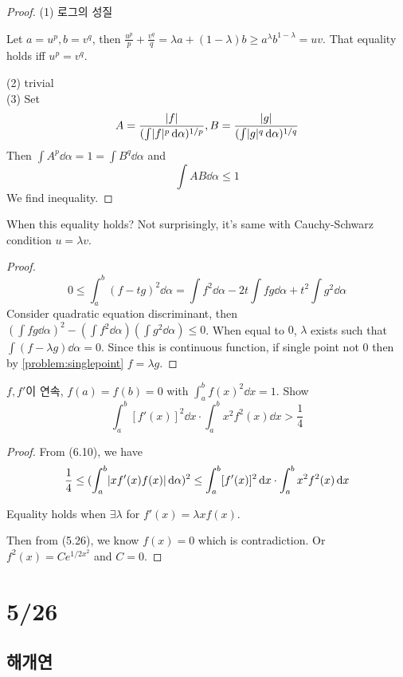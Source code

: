 \documentclass{article}
\begin{document}
\begin{proof}
    (1) 로그의 성질

    Let $a=u^p, b=v^q$, then $\frac{u^p}{p}+\frac{v^q}{q}= \lambda a + (1-\lambda) b \geq a^{\lambda}b^{1-\lambda}=uv$. That equality holds iff $u^p = v^q$.

    (2) trivial\\
    (3) Set \[A=\frac{\lvert f\rvert}{(\int \lvert f\rvert^p \,\mathrm{d}\alpha)^{1/p}},\\B=\frac{\lvert g\rvert}{(\int \lvert g\rvert^q \,\mathrm{d}\alpha)^{1/q}}\] Then $\int A^p \dd\alpha=1=\int B^q \dd\alpha$ and \[\int AB \dd\alpha \leq 1\] We find inequality.
\end{proof}

When this equality holds? Not surprisingly, it's same with Cauchy-Schwarz condition $u=\lambda v$.

\begin{proof}
    \[0 \leq \int^b_a (f-tg)^2 \dd\alpha = \int f^2 \dd\alpha - 2t \int fg \dd\alpha + t^2 \int g^2 \dd\alpha\]
    Consider quadratic equation discriminant, then $(\int fg \dd\alpha)^2 - (\int f^2 \dd\alpha)(\int g^2\dd\alpha) \leq 0$. When equal to $0$, $\lambda$ exists such that $\int (f-\lambda g) \dd\alpha=0$. Since this is continuous function, if single point not $0$ then by \cref{problem:singlepoint} $f=\lambda g$.
\end{proof}

\begin{proposition}
    $f,f'$이 연속, $f(a)=f(b)=0$ with $\int^b_a {f(x)}^2 \dd x=1$. Show \[\int^b_a[f'(x)]^2\dd x \cdot \int^b_a x^2f^2(x) \dd x > \frac{1}{4}\]
\end{proposition}

\begin{proof}
    From (6.10), we have \[\frac{1}{4}\leq (\int^b_a \lvert xf'(x)f(x)\rvert\,\mathrm{d}\alpha)^2 \leq \int^b_a[f'(x)]^2\,\mathrm{d} x \cdot \int^b_a x^2f^2(x) \,\mathrm{d} x\]

    Equality holds when $\exists \lambda$ for $f'(x)=\lambda xf(x)$.

    Then from (5.26), we know $f(x)=0$ which is contradiction.
    Or $f^2(x)=Ce^{1/2x^2}$ and $C=0$.
\end{proof}

\section*{5/26}

\subsection*{해개연}
\end{document}
